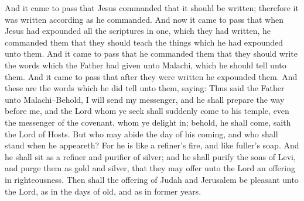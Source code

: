 And it came to pass that Jesus commanded that it should be written; therefore it was written according as he commanded.
\bverse \iffalse And now it came to pass that when Jesus had expounded all the scriptures in one, which they had written, he commanded them that they should teach the things which he had expounded unto them. \fi
And now it came to pass that when Jesus had expounded all the scriptures in one, which they had written, he commanded them that they should teach the things which he had expounded unto them.
\bchapter
\bverse \iffalse And it came to pass that he commanded them that they should write the words which the Father had given unto Malachi, which he should tell unto them. And it came to pass that after they were written he expounded them. And these are the words which he did tell unto them, saying: Thus said the Father unto Malachi--Behold, I will send my messenger, and he shall prepare the way before me, and the Lord whom ye seek shall suddenly come to his temple, even the messenger of the covenant, whom ye delight in; behold, he shall come, saith the Lord of Hosts. \fi
And it came to pass that he commanded them that they should write the words which the Father had given unto Malachi, which he should tell unto them. And it came to pass that after they were written he expounded them. And these are the words which he did tell unto them, saying: Thus said the Father unto Malachi--Behold, I will send my messenger, and he shall prepare the way before me, and the Lord whom ye seek shall suddenly come to his temple, even the messenger of the covenant, whom ye delight in; behold, he shall come, saith the Lord of Hosts.
\bverse \iffalse But who may abide the day of his coming, and who shall stand when he appeareth? For he is like a refiner's fire, and like fuller's soap. \fi
But who may abide the day of his coming, and who shall stand when he appeareth? For he is like a refiner's fire, and like fuller's soap.
\bverse \iffalse And he shall sit as a refiner and purifier of silver; and he shall purify the sons of Levi, and purge them as gold and silver, that they may offer unto the Lord an offering in righteousness. \fi
And he shall sit as a refiner and purifier of silver; and he shall purify the sons of Levi, and purge them as gold and silver, that they may offer unto the Lord an offering in righteousness.
\bverse \iffalse Then shall the offering of Judah and Jerusalem be pleasant unto the Lord, as in the days of old, and as in former years. \fi
Then shall the offering of Judah and Jerusalem be pleasant unto the Lord, as in the days of old, and as in former years.
